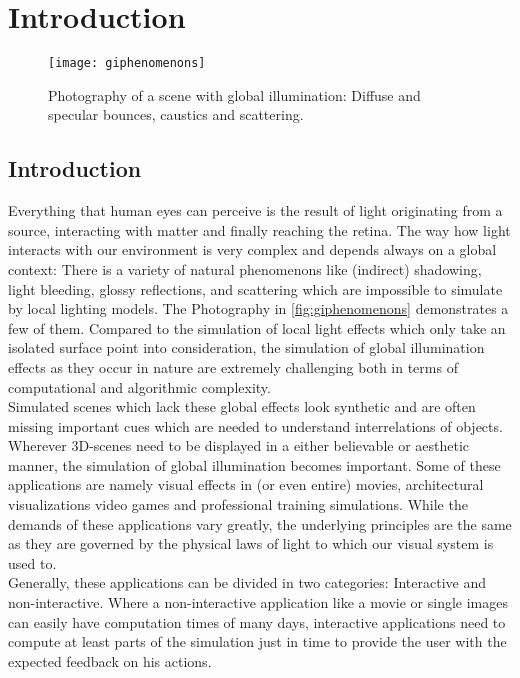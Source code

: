 \documentclass[thesis.tex]{subfiles}
\begin{document}
\chapter{Introduction}
\label{chap:introduction}

\begin{figure}[h]
\centering
\texttt{[image: giphenomenons]}
\caption{\cite{bib:RealtimeGIOverview} Photography of a scene with global illumination: Diffuse and specular bounces, caustics and scattering.}
\label{fig:giphenomenons}
\end{figure}

\section{Introduction}
Everything that human eyes can perceive is the result of light originating from a source, interacting with matter and finally reaching the retina.
The way how light interacts with our environment is very complex and depends always on a global context:
There is a variety of natural phenomenons like (indirect) shadowing, light bleeding, glossy reflections, and scattering which are impossible to simulate by local lighting models.
The Photography in \autoref{fig:giphenomenons} demonstrates a few of them.
Compared to the simulation of local light effects which only take an isolated surface point into consideration, the simulation of global illumination effects as they occur in nature are extremely challenging both in terms of computational and algorithmic complexity.
\\
Simulated scenes which lack these global effects look synthetic and are often missing important cues which are needed to understand interrelations of objects.
Wherever 3D-scenes need to be displayed in a either believable or aesthetic manner, the simulation of global illumination becomes important.
Some of these applications are namely visual effects in (or even entire) movies, architectural visualizations video games and professional training simulations.
While the demands of these applications vary greatly, the underlying principles are the same as they are governed by the physical laws of light to which our visual system is used to.
\\
Generally, these applications can be divided in two categories: Interactive and non-interactive.
Where a non-interactive application like a movie or single images can easily have computation times of many days, interactive applications need to compute at least parts of the simulation just in time to provide the user with the expected feedback on his actions.
\end{document}
